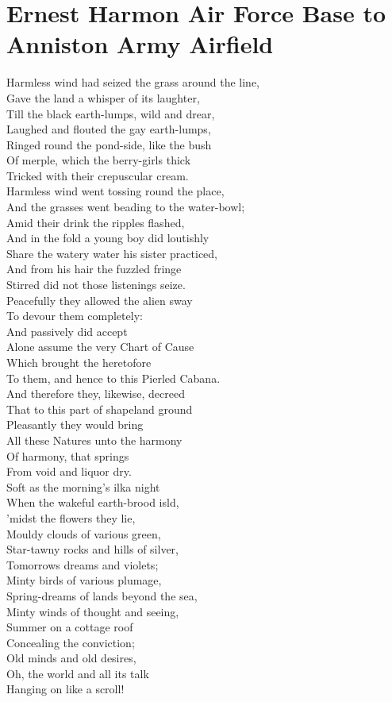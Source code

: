 \documentclass[smalldemyvopaper,11pt,twoside,onecolumn,openright,extrafontsizes]{memoir}
\begin{document}
\chapter{Ernest Harmon Air Force Base to Anniston Army Airfield}
Harmless wind had seized the grass around the line,
\\Gave the land a whisper of its laughter,
\\Till the black earth-lumps, wild and drear,
\\Laughed and flouted the gay earth-lumps,
\\Ringed round the pond-side, like the bush
\\Of merple, which the berry-girls thick
\\Tricked with their crepuscular cream.
\\Harmless wind went tossing round the place,
\\And the grasses went beading to the water-bowl;
\\Amid their drink the ripples flashed,
\\And in the fold a young boy did loutishly
\\Share the watery water his sister practiced,
\\And from his hair the fuzzled fringe
\\Stirred did not those listenings seize.
\\Peacefully they allowed the alien sway
\\To devour them completely:
\\And passively did accept
\\Alone assume the very Chart of Cause
\\Which brought the heretofore
\\To them, and hence to this Pierled Cabana.
\\And therefore they, likewise, decreed
\\That to this part of shapeland ground
\\Pleasantly they would bring
\\All these Natures unto the harmony
\\Of harmony, that springs
\\From void and liquor dry.
\\Soft as the morning's ilka night
\\When the wakeful earth-brood isld,
\\'midst the flowers they lie,
\\Mouldy clouds of various green,
\\Star-tawny rocks and hills of silver,
\\Tomorrows dreams and violets;
\\Minty birds of various plumage,
\\Spring-dreams of lands beyond the sea,
\\Minty winds of thought and seeing,
\\Summer on a cottage roof
\\Concealing the conviction;
\\Old minds and old desires,
\\Oh, the world and all its talk
\\Hanging on like a scroll!
\end{document}
